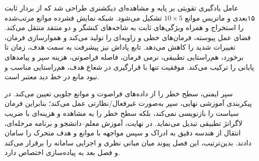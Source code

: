 عامل یادگیری تقویتی بر پایه  و مشاهده‌ای دیکشنری طراحی شد که از بردار ثابت ۱۵بعدی و ماتریس موانع \(10\times5\) تشکیل می‌شود. شبکه  نمایش فشرده موانع مرتب‌شده را استخراج و همراه ویژگی‌های ثابت به شاخه‌های کنشگر و دو منتقد منتقل می‌کند. فضای عمل پیوسته، فرمان‌های خطی و زاویه‌ای را تولید می‌کند و هموارسازی فرمان، تغییرات شدید را کاهش می‌دهد. تابع پاداش نیز پیشرفت به سمت هدف، زمان تا برخورد، هم‌راستایی تطبیقی، نرمی فرمان، فاصله فراصوتی، هزینه سپر و پیامدهای پایانی را ترکیب می‌کند. موفقیت تنها با قرارگیری در شعاع هدف، هم‌راستایی مناسب و نبود مانع در خط دید معتبر است.

سپر ایمنی، سطح خطر را از داده‌های فراصوت و موانع جلویی تعیین می‌کند. در پیکربندی آموزشی نهایی، سپر به‌صورت غیرفعال/نظارتی عمل می‌کند؛ بنابراین فرمان سیاست را بازنویسی نمی‌کند، بلکه سطح خطر را به مشاهده و هزینه‌ای با ضریب لاگرانژ تطبیقی تبدیل می‌نماید. در نهایت، آموزش معلم--دانشجو و برنامه مرحله‌ای، انتقال از هندسه دقیق به ادراک و سپس مواجهه با موانع و هدف متحرک را سامان دادند. بدین‌ترتیب، این فصل پیوند میان مبانی نظری و اجرایی سامانه را برقرار می‌کند و فصل بعد به پیاده‌سازی اختصاص دارد.
